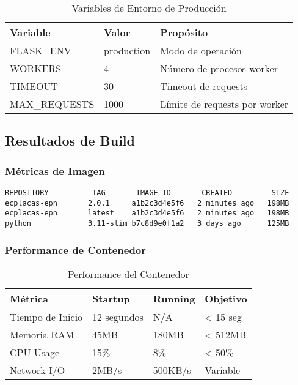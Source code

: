 \documentclass[12pt,a4paper]{article}
\begin{document}
\begin{table}[h]
\centering
\begin{tabularx}{\textwidth}{|X|X|X|}
\hline
\textbf{Variable} & \textbf{Valor} & \textbf{Propósito} \\
\hline
FLASK\_ENV & production & Modo de operación \\
\hline
WORKERS & 4 & Número de procesos worker \\
\hline
TIMEOUT & 30 & Timeout de requests \\
\hline
MAX\_REQUESTS & 1000 & Límite de requests por worker \\
\hline
\end{tabularx}
\caption{Variables de Entorno de Producción}
\end{table}

\subsection{Resultados de Build}

\subsubsection{Métricas de Imagen}

\begin{verbatim}
REPOSITORY          TAG       IMAGE ID       CREATED         SIZE
ecplacas-epn       2.0.1     a1b2c3d4e5f6   2 minutes ago   198MB
ecplacas-epn       latest    a1b2c3d4e5f6   2 minutes ago   198MB
python             3.11-slim b7c8d9e0f1a2   3 days ago      125MB
\end{verbatim}

\subsubsection{Performance de Contenedor}

\begin{table}[h]
\centering
\begin{tabularx}{\textwidth}{|X|X|X|X|}
\hline
\textbf{Métrica} & \textbf{Startup} & \textbf{Running} & \textbf{Objetivo} \\
\hline
Tiempo de Inicio & 12 segundos & N/A & < 15 seg \\
\hline
Memoria RAM & 45MB & 180MB & < 512MB \\
\hline
CPU Usage & 15\% & 8\% & < 50\% \\
\hline
Network I/O & 2MB/s & 500KB/s & Variable \\
\hline
\end{tabularx}
\caption{Performance del Contenedor}
\end{table}
\end{document}
